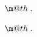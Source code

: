 \usepackage{etoolbox}

\makeatletter
\let\old@tocline\@tocline
\let\section@tocline\@tocline
\newcommand{\subsection@dotsep}{4.5}
\newcommand{\subsubsection@dotsep}{4.5}
\patchcmd{\@tocline}
  {\hfil}
  {\nobreak
     \leaders\hbox{$\m@th
        \mkern \subsection@dotsep mu\hbox{.}\mkern \subsection@dotsep mu$}\hfill
     \nobreak}{}{}
\let\subsection@tocline\@tocline
\let\@tocline\old@tocline

\patchcmd{\@tocline}
  {\hfil}
  {\nobreak
     \leaders\hbox{$\m@th
        \mkern \subsubsection@dotsep mu\hbox{.}\mkern \subsubsection@dotsep mu$}\hfill
     \nobreak}{}{}
\let\subsubsection@tocline\@tocline
\let\@tocline\old@tocline

